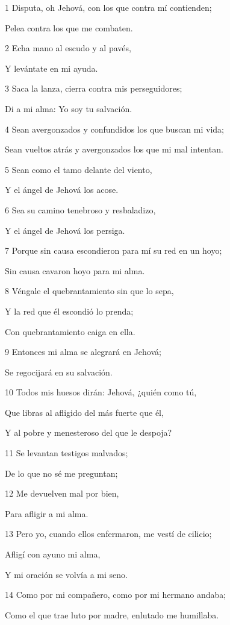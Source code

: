 \par 1 Disputa, oh Jehová, con los que contra mí contienden;
\par Pelea contra los que me combaten.
\par 2 Echa mano al escudo y al pavés,
\par Y levántate en mi ayuda.
\par 3 Saca la lanza, cierra contra mis perseguidores;
\par Di a mi alma: Yo soy tu salvación.
\par 4 Sean avergonzados y confundidos los que buscan mi vida;
\par Sean vueltos atrás y avergonzados los que mi mal intentan.
\par 5 Sean como el tamo delante del viento,
\par Y el ángel de Jehová los acose.
\par 6 Sea su camino tenebroso y resbaladizo,
\par Y el ángel de Jehová los persiga.
\par 7 Porque sin causa escondieron para mí su red en un hoyo;
\par Sin causa cavaron hoyo para mi alma.
\par 8 Véngale el quebrantamiento sin que lo sepa,
\par Y la red que él escondió lo prenda;
\par Con quebrantamiento caiga en ella.
\par 9 Entonces mi alma se alegrará en Jehová;
\par Se regocijará en su salvación.
\par 10 Todos mis huesos dirán: Jehová, ¿quién como tú,
\par Que libras al afligido del más fuerte que él,
\par Y al pobre y menesteroso del que le despoja?
\par 11 Se levantan testigos malvados;
\par De lo que no sé me preguntan;
\par 12 Me devuelven mal por bien,
\par Para afligir a mi alma.
\par 13 Pero yo, cuando ellos enfermaron, me vestí de cilicio;
\par Afligí con ayuno mi alma,
\par Y mi oración se volvía a mi seno.
\par 14 Como por mi compañero, como por mi hermano andaba;
\par Como el que trae luto por madre, enlutado me humillaba.
